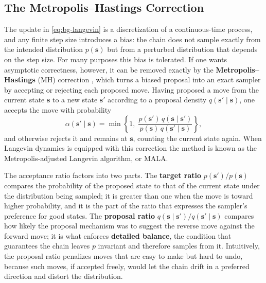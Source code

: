 \subsection{The Metropolis--Hastings Correction}
\label{sec:bg-mh}

The update in \eqref{eq:bg-langevin} is a discretization of a continuous-time process, and any finite step size introduces a bias: the chain does not sample exactly from the intended distribution $p(\bm{s})$ but from a perturbed distribution that depends on the step size. For many purposes this bias is tolerated. If one wants asymptotic correctness, however, it can be removed exactly by the \textbf{Metropolis--Hastings} (MH) correction \citep{metropolis1953equation, hastings1970monte}, which turns a biased proposal into an exact sampler by accepting or rejecting each proposed move. Having proposed a move from the current state $\bm{s}$ to a new state $\bm{s}'$ according to a proposal density $q(\bm{s}' \mid \bm{s})$, one accepts the move with probability
\begin{equation}
    \alpha(\bm{s}' \mid \bm{s}) = \min\left\{ 1,\; \frac{p(\bm{s}')\, q(\bm{s} \mid \bm{s}')}{p(\bm{s})\, q(\bm{s}' \mid \bm{s})} \right\},
    \label{eq:bg-mh}
\end{equation}
and otherwise rejects it and remains at $\bm{s}$, counting the current state again. When Langevin dynamics is equipped with this correction the method is known as the Metropolis-adjusted Langevin algorithm, or MALA.

The acceptance ratio factors into two parts. The \textbf{target ratio} $p(\bm{s}')/p(\bm{s})$ compares the probability of the proposed state to that of the current state under the distribution being sampled; it is greater than one when the move is toward higher probability, and it is the part of the ratio that expresses the sampler's preference for good states. The \textbf{proposal ratio} $q(\bm{s} \mid \bm{s}')/q(\bm{s}' \mid \bm{s})$ compares how likely the proposal mechanism was to suggest the reverse move against the forward move; it is what enforces \textbf{detailed balance}, the condition that guarantees the chain leaves $p$ invariant and therefore samples from it. Intuitively, the proposal ratio penalizes moves that are easy to make but hard to undo, because such moves, if accepted freely, would let the chain drift in a preferred direction and distort the distribution.

